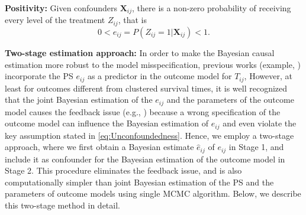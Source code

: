 \documentclass[aoas]{imsart}
\theoremstyle{plain}
\theoremstyle{definition}
\begin{document}
\noindent\textbf{Positivity:} Given confounders $\mathbf{X}_{ij}$, there is a non-zero probability of receiving every level of the treatment $Z_{ij}$, that is
\begin{equation}
    0 < e_{ij}=P(Z_{ij}=1\vert \mathbf{X}_{ij})<1.
\end{equation}

\textbf{Two-stage estimation approach:} 
In order to make the Bayesian causal estimation more robust to the model misspecification, 
previous works (example,  \cite{hahn2020bayesian}) incorporate the PS $e_{ij}$ as a predictor in the outcome model for $T_{ij}$, However, at least for outcomes different from clustered survival times, it is well recognized that the joint Bayesian estimation of the $e_{ij}$ and the parameters of the outcome model causes the feedback issue (e.g., \parencite{zigler2013model, zigler2015propensity, li2023bayesian}) because a wrong specification of the outcome model can influence the Bayesian estimation of $e_{ij}$ and even violate the key assumption stated in  \eqref{eq:Unconfoundedness}. Hence, we employ a two-stage approach, where we first obtain a Bayesian estimate $\hat{e}_{ij}$ of $e_{ij}$ in Stage 1, and include it as confounder for the Bayesian estimation of the outcome model in Stage 2. This procedure eliminates the feedback issue, and is also computationally simpler than joint Bayesian estimation of the PS and the parameters of outcome models using single MCMC algorithm. 
Below, we describe this two-stage method in detail.
\end{document}
